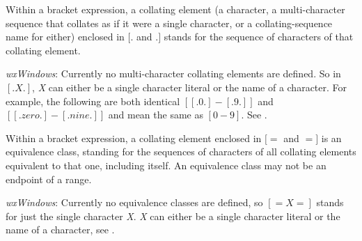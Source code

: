 Within a bracket
expression, a collating element (a character, a multi-character sequence
that collates as if it were a single character, or a collating-sequence
name for either) enclosed in {\bf $[.$} and {\bf $.]$} stands for the
sequence of characters of that collating element.

{\it wxWindows}: Currently no multi-character collating elements are defined.
So in {\bf $[.X.]$}, {\it X} can either be a single character literal or
the name of a character. For example, the following are both identical
 {\bf $[[.0.]-[.9.]]$} and {\bf $[[.zero.]-[.nine.]]$} and mean the same as
 {\bf $[0-9]$}.
 See .

%

Within a bracket expression, a collating element enclosed in {\bf $[=$} and {\bf $=]$}
is an equivalence class, standing for the sequences of characters of all
collating elements equivalent to that one, including itself.
An equivalence class may not be an endpoint of a range.


{\it wxWindows}: Currently no equivalence classes are defined, so 
{\bf $[=X=]$} stands for just the single character {\it X}. 
 {\it X} can either be a single character literal or the name of a character,
see .

